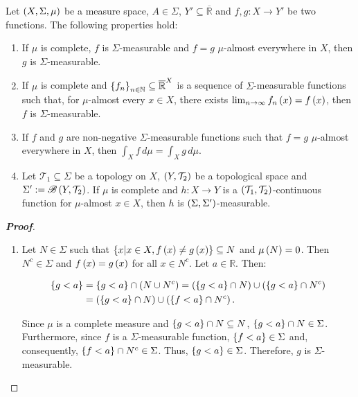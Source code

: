 \begin{proposition}
  Let $\left(X,\Sigma,\mu\right)$ be a measure space, $A\in\Sigma$, $Y'\subseteq\overline{\mathbb{R}}$ and $f,g:X\rightarrow Y'$ be two functions. The following properties hold:

  \begin{enumerate}
    \item If $\mu$ is complete, $f$ is $\Sigma$-measurable and $f=g$ $\mu$-almost everywhere in $X$, then $g$ is $\Sigma$-measurable.
    \item If $\mu$ is complete and $\left\{f_n\right\}_{n\in\mathbb{N}}\subseteq\overline{\mathbb{R}}^X$ is a sequence of $\Sigma$-measurable functions such that, for $\mu$-almost every $x\in X$, there exists $\lim_{n\to\infty}{f_n\left(x\right)}=f\left(x\right)$, then $f$ is $\Sigma$-measurable.
    \item If $f$ and $g$ are non-negative $\Sigma$-measurable functions such that $f=g$ $\mu$-almost everywhere in $X$, then $\int_{X}{f\,d\mu}=\int_{X}{g\,d\mu}$.
    \item Let $\mathcal{T}_1\subseteq\Sigma$ be a topology on $X$, $\left(Y,\mathcal{T}_2\right)$ be a topological space and $\Sigma':=\mathscr{B}\left(Y,\mathcal{T}_2\right)$. If $\mu$ is complete and $h:X\rightarrow Y$ is a $\left(\mathcal{T}_1,\mathcal{T}_2\right)$-continuous function for $\mu$-almost $x\in X$, then $h$ is $\left(\Sigma,\Sigma'\right)$-measurable. 
  \end{enumerate}
  \begin{proof}[\rm\textbf{Proof}]
    \hfill
    \begin{enumerate}
      \item Let $N\in\Sigma$ such that $\left\{x\middle|x\in X,f\left(x\right)\neq g\left(x\right)\right\}\subseteq N$ and $\mu\left(N\right)=0$. Then $N^c\in\Sigma$ and $f\left(x\right)=g\left(x\right)$ for all $x\in N^c$. Let $a\in\mathbb{R}$. Then:
      
      \begin{equation}
        \begin{split}
          \left\{g<a\right\} & =\left\{g<a\right\}\cap\left(N\cup N^c\right)=\left(\left\{g<a\right\}\cap N\right)\cup\left(\left\{g<a\right\}\cap N^c\right)\\
          & =\left(\left\{g<a\right\}\cap N\right)\cup\left(\left\{f<a\right\}\cap N^c\right).
        \end{split}
      \end{equation}

      Since $\mu$ is a complete measure and $\left\{g<a\right\}\cap N\subseteq N$, $\left\{g<a\right\}\cap N\in\Sigma$. Furthermore, since $f$ is a $\Sigma$-measurable function, $\left\{f<a\right\}\in\Sigma$ and, consequently, $\left\{f<a\right\}\cap N^c\in\Sigma$. Thus, $\left\{g<a\right\}\in\Sigma$. Therefore, $g$ is $\Sigma$-measurable.


\end{enumerate}
\end{proof}
\end{proposition}
